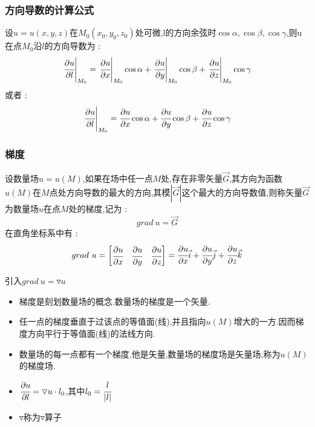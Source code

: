 \documentclass[UTF8,12pt]{ctexbook}
\newcommand{\directionDerivative}[3]{\left.\cfrac{\partial #1}{\partial #2}\right|_{#3}}
\newcommand{\partialDerivativeFrac}[2]{\cfrac{\partial #1}{\partial #2}}
\begin{document}
{{{    \subsubsection{方向导数的计算公式}{
      设$u= u(x,y,z)$在$M_0(x_0,y_0,z_0)$处可微,l的方向余弦时$\cos\alpha,\cos\beta,\cos\gamma$,则u在点$M_0$沿$l$的方向导数为 :
      $$
        \directionDerivative{u}{l}{M_0} = \directionDerivative{u}{x}{M_0}\cos\alpha + \directionDerivative{u}{y}{M_0}\cos\beta + \directionDerivative{u}{z}{M_0}\cos\gamma
      $$
      或者 :
      $$
        \directionDerivative{u}{l}{M_0} = \partialDerivativeFrac{u}{x}\cos\alpha + \partialDerivativeFrac{u}{y}\cos\beta + \partialDerivativeFrac{u}{z}\cos\gamma
      $$
    }%

    \subsubsection{梯度}{
      设数量场$u = u(M)$,如果在场中任一点$M$处,存在非零矢量$\vec{G}$,其方向为函数$u(M)$在$M$点处方向导数的最大的方向,其模$|\vec{G}|$这个最大的方向导数值,则称矢量$\vec{G}$为数量场$u$在点$M$处的梯度,记为 :
      $$
        grad\ u = \vec{G}
      $$
      在直角坐标系中有 :
      $$
        grad\ u = \begin{bmatrix}
          \partialDerivativeFrac{u}{x} & \partialDerivativeFrac{u}{y} & \partialDerivativeFrac{u}{z}
        \end{bmatrix} = \partialDerivativeFrac{u}{x}\vec{i} + \partialDerivativeFrac{u}{y}\vec{j} + \partialDerivativeFrac{u}{z}\vec{k}
      $$

      引入$grad\ u = \triangledown u$

      \begin{itemize}
        \item 梯度是刻划数量场的概念.数量场的梯度是一个矢量.
        \item 任一点的梯度垂直于过该点的等值面(线),并且指向$u(M)$增大的一方.因而梯度方向平行于等值面(线)的法线方向.
        \item 数量场的每一点都有一个梯度,他是矢量,数量场的梯度场是矢量场,称为$u(M)$的梯度场.
        \item $\partialDerivativeFrac{u}{l} = \triangledown u \cdot l_0$,其中$l_0= \cfrac{l}{|l|}$
        \item $\triangledown$称为$\triangledown$算子
      \end{itemize}
    }%

}}}
\end{document}
